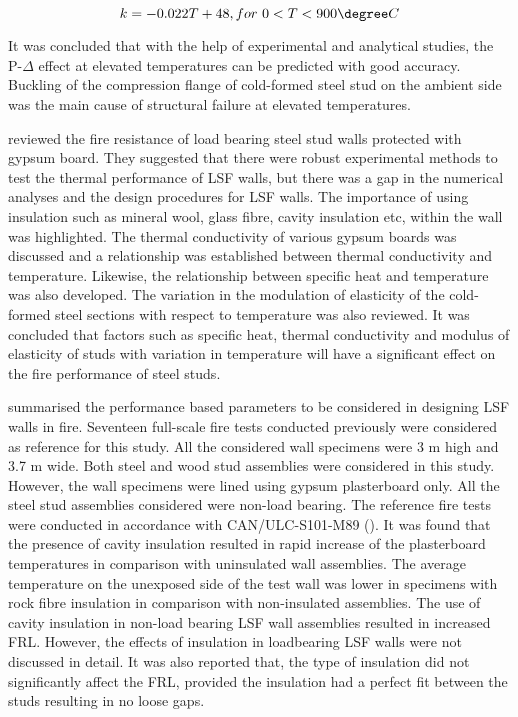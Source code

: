 \begin{equation}
k = -0.022T + 48, for~0 < T < 900\degree C
\end{equation}

It was concluded that with the help of experimental and analytical studies, the P-$\Delta$ effect at elevated temperatures can be predicted with good accuracy. Buckling of the compression flange of cold-formed steel stud on the ambient side was the main cause of structural failure at elevated temperatures.

\citet{Alfawakhiri1999} reviewed the fire resistance of load bearing steel stud walls protected with gypsum board. They suggested that there were robust experimental methods to test the thermal performance of LSF walls, but there was a gap in the numerical analyses and the design procedures for LSF walls. The importance of using insulation such as mineral wool, glass fibre, cavity insulation etc, within the wall was highlighted. The thermal conductivity of various gypsum boards was discussed and a relationship was established between thermal conductivity and temperature. Likewise, the relationship between specific heat and temperature was also developed. The variation in the modulation of elasticity of the cold-formed steel sections with respect to temperature was also reviewed. It was concluded that factors such as specific heat, thermal conductivity and modulus of elasticity of studs with variation in temperature will have a significant effect on the fire performance of steel studs.   

\citet{Sultan2000a} summarised the performance based parameters to be considered in designing LSF walls in fire. Seventeen full-scale fire tests conducted previously were considered as reference for this study. All the considered wall specimens were 3 m high and 3.7 m wide. Both steel and wood stud assemblies were considered in this study. However, the wall specimens were lined using gypsum plasterboard only. All the steel stud assemblies considered were non-load bearing. The reference fire tests were conducted in accordance with CAN/ULC-S101-M89 (\citeyear{ULC1989}). It was found that the presence of cavity insulation resulted in rapid increase of the plasterboard temperatures in comparison with uninsulated wall assemblies. The average temperature on the unexposed side of the test wall was lower in specimens with rock fibre insulation in comparison with non-insulated assemblies. The use of cavity insulation in non-load bearing LSF wall assemblies resulted in increased FRL. However, the effects of insulation in loadbearing LSF walls were not discussed in detail. It was also reported that, the type of insulation did not significantly affect the FRL, provided the insulation had a perfect fit between the studs resulting in no loose gaps.

